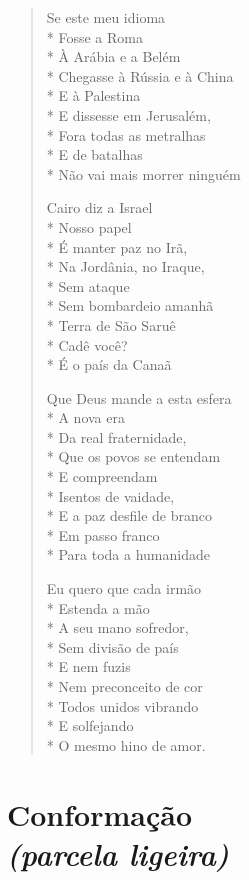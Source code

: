 \begin{verse}
Se este meu idioma\\*
Fosse a Roma\\*
À Arábia e a Belém\\*
Chegasse à Rússia e à China\\*
E à Palestina\\*
E dissesse em Jerusalém,\\*
Fora todas as metralhas\\*
E de batalhas\\*
Não vai mais morrer ninguém

Cairo diz a Israel\\*
Nosso papel\\*
É manter paz no Irã,\\*
Na Jordânia, no Iraque,\\*
Sem ataque\\*
Sem bombardeio amanhã\\*
Terra de São Saruê\\*
Cadê você?\\*
É o país da Canaã

Que Deus mande a esta esfera\\*
A nova era\\*
Da real fraternidade,\\*
Que os povos se entendam\\*
E compreendam\\*
Isentos de vaidade,\\*
E a paz desfile de branco\\*
Em passo franco\\*
Para toda a humanidade

Eu quero que cada irmão\\*
Estenda a mão\\*
A seu mano sofredor,\\*
Sem divisão de país\\*
E nem fuzis\\*
Nem preconceito de cor\\*
Todos unidos vibrando\\*
E solfejando\\*
O mesmo hino de amor.
\end{verse}


\chapter[Conformação]{Conformação\\\smallskip\textit{(parcela ligeira)}}

